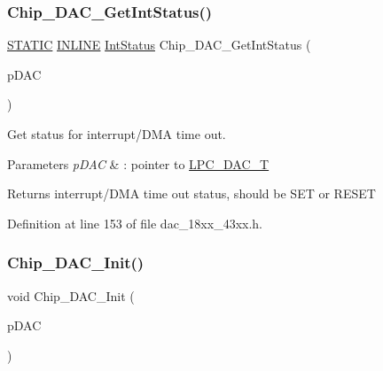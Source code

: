 \subsubsection{\texorpdfstring{Chip\+\_\+\+D\+A\+C\+\_\+\+Get\+Int\+Status()}{Chip\_DAC\_GetIntStatus()}}
{\footnotesize\ttfamily \hyperlink{group___l_p_c___types___public___macros_ga10b2d890d871e1489bb02b7e70d9bdfb}{S\+T\+A\+T\+IC} \hyperlink{spifi__18xx__43xx_8h_a2eb6f9e0395b47b8d5e3eeae4fe0c116}{I\+N\+L\+I\+NE} \hyperlink{group___l_p_c___types___public___types_gab7d263072f745b4f3913fb0afc434c4e}{Int\+Status} Chip\+\_\+\+D\+A\+C\+\_\+\+Get\+Int\+Status (\begin{DoxyParamCaption}\item[{\hyperlink{struct_l_p_c___d_a_c___t}{L\+P\+C\+\_\+\+D\+A\+C\+\_\+T} $\ast$}]{p\+D\+AC }\end{DoxyParamCaption})}



Get status for interrupt/\+D\+MA time out. 


\begin{DoxyParams}{Parameters}
{\em p\+D\+AC} & \+: pointer to \hyperlink{struct_l_p_c___d_a_c___t}{L\+P\+C\+\_\+\+D\+A\+C\+\_\+T} \\
\hline
\end{DoxyParams}
\begin{DoxyReturn}{Returns}
interrupt/\+D\+MA time out status, should be S\+ET or R\+E\+S\+ET 
\end{DoxyReturn}


Definition at line 153 of file dac\+\_\+18xx\+\_\+43xx.\+h.

\mbox{\label{group___d_a_c__18_x_x__43_x_x_ga677c6f03e4ea92656c4cb3497fbb4a1b}} 
\subsubsection{\texorpdfstring{Chip\+\_\+\+D\+A\+C\+\_\+\+Init()}{Chip\_DAC\_Init()}}
{\footnotesize\ttfamily void Chip\+\_\+\+D\+A\+C\+\_\+\+Init (\begin{DoxyParamCaption}\item[{\hyperlink{struct_l_p_c___d_a_c___t}{L\+P\+C\+\_\+\+D\+A\+C\+\_\+T} $\ast$}]{p\+D\+AC }\end{DoxyParamCaption})}



